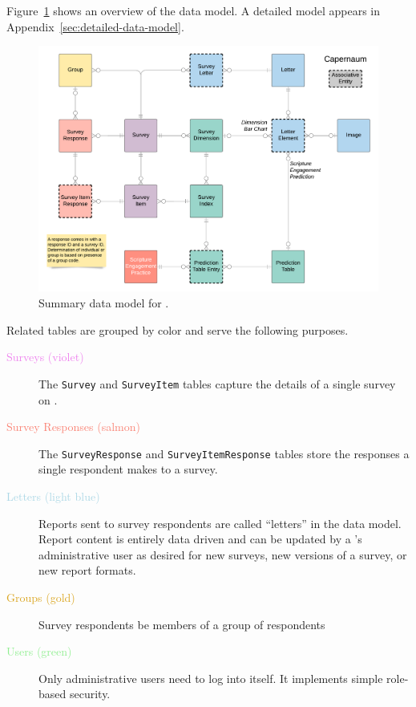 \documentclass{article}
\begin{document}
Figure~\ref{fig:summary-data-model}
shows an overview of the \caper{} data model.
A detailed model appears in Appendix~\ref{sec:detailed-data-model}.
\begin{figure}
  \centering
  \includegraphics[width=\textwidth]{data-model-overview}
  \caption{Summary data model for \caper.}
  \label{fig:summary-data-model}
\end{figure}
Related tables are grouped by color
and serve the following purposes.
\begin{description}
\item[\textcolor{Violet}{Surveys (violet)}]
  The \texttt{Survey} and \texttt{SurveyItem} tables
  capture the details of a single survey on \qual.
\item[\textcolor{Salmon}{Survey Responses (salmon)}]
  The \texttt{SurveyResponse}
  and \texttt{SurveyItemResponse}
  tables store the responses a single respondent
  makes to a survey.
\item[\textcolor{LightBlue}{Letters (light blue)}]
  Reports sent to survey respondents are called ``letters'' in the data model.
  Report content is entirely data driven and can be updated by a \caper's administrative user
  as desired for new surveys, new versions of a survey, or new report formats.
\item[\textcolor{Goldenrod}{Groups (gold)}]
  Survey respondents be members of a group of respondents
\item[\textcolor{LightGreen}{Users (green)}]
  Only administrative users need to log into \caper{} itself.
  It implements simple role-based security.
\end{description}
\end{document}
